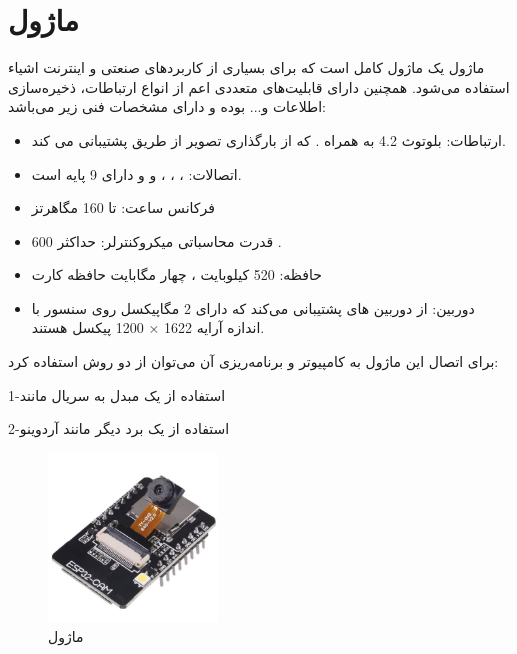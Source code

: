 \section{ماژول }

ماژول
یک ماژول کامل است که برای بسیاری از کاربردهای صنعتی و اینترنت اشیاء استفاده می‌شود. همچنین دارای قابلیت‌های متعددی اعم از انواع ارتباطات، ذخیره‌سازی اطلاعات و... بوده و دارای مشخصات فنی زیر می‌باشد:
\begin{itemize}
	\item 
	ارتباطات: بلوتوث 4.2  به همراه . که از بارگذاری تصویر از طریق  پشتیبانی می کند.
	\item
	اتصالات:  ،  ، ، و  و دارای 9 پایه  است.
	\item
	فرکانس ساعت: تا 160 مگاهرتز
	\item
	قدرت محاسباتی میکروکنترلر: حداکثر 600 .
	\item
	حافظه: 520 کیلوبایت ، چهار مگابایت حافظه کارت 
	\item
	دوربین: از دوربین های  پشتیبانی می‌کند که دارای 2 مگاپیکسل روی سنسور با اندازه آرایه  1622 × 1200 پیکسل هستند.
\end{itemize}

\newpage
برای اتصال این ماژول به کامپیوتر و برنامه‌ریزی
\noindent\unskip{}
آن می‌توان از دو روش استفاده کرد:

1-استفاده از یک مبدل  به سریال مانند

2-استفاده از یک برد دیگر مانند آردوینو
\noindent\unskip
\noindent\unskip{}


\begin{figure}[H]
	\centering
	\includegraphics[width=0.4\textwidth]{./images/Chapter4/ESP32CAM}
	\caption[ماژول ]{ماژول  \cite{ESP32CAM}}
	\label{ماژول ای اس پی}
\end{figure}

